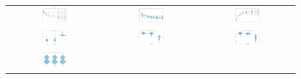 \begin{figure}[h]
    \centering
    \begin{tabular}{ccc}
        \includegraphics[width=0.3\textwidth]{figures/GlobalKMeans/hepatitis_violin_k_vs_CHS.png} & 
        \includegraphics[width=0.3\textwidth]{figures/GlobalKMeans/mushroom_violin_k_vs_CHS.png} & 
        \includegraphics[width=0.3\textwidth]{figures/GlobalKMeans/penbased_violin_k_vs_NMI.png} \\
        \includegraphics[width=0.3\textwidth]{figures/GlobalKMeans/hepatitis_violin_Distance_Metric_vs_ARI.png} & 
        \includegraphics[width=0.3\textwidth]{figures/GlobalKMeans/mushroom_violin_Distance_Metric_vs_Silhouette.png} & 
        \includegraphics[width=0.3\textwidth]{figures/GlobalKMeans/penbased_violin_Distance_Metric_vs_Silhouette.png} \\
        \includegraphics[width=0.3\textwidth]{figures/GlobalKMeans/hepatitis_violin_N_Buckets_vs_CHS.png} & 

\end{tabular}
\end{figure}
